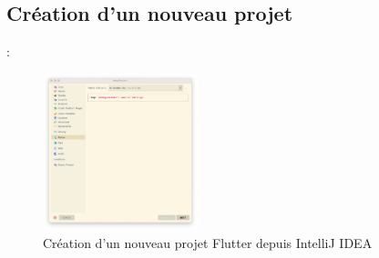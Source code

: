 \documentclass[10pt]{beamer}
\begin{document}
\subsection{Création d'un nouveau projet}
\begin{frame}[fragile,t]{\secname : \subsecname}
    \begin{figure}[H]
        \begin{center}
            \includegraphics[width=0.4\textwidth]{../assets/img/new-project-1.jpg}
            \caption*{Création d'un nouveau projet Flutter depuis IntelliJ IDEA}
            \label{Fig:new-project-1}
        \end{center}
    \end{figure}
\end{frame}
\end{document}
